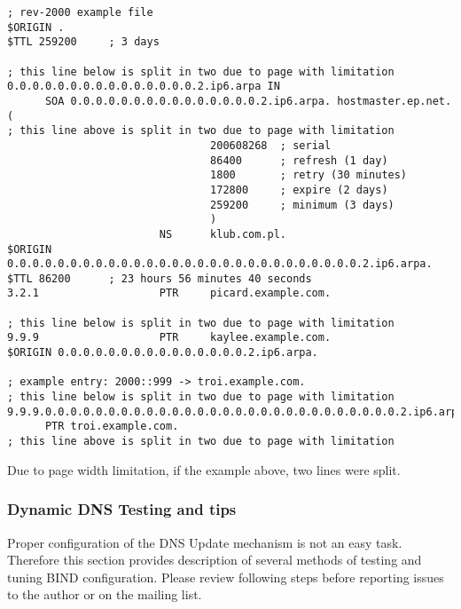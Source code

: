 \begin{lstlisting}
; rev-2000 example file
$ORIGIN .
$TTL 259200     ; 3 days

; this line below is split in two due to page with limitation
0.0.0.0.0.0.0.0.0.0.0.0.0.0.0.2.ip6.arpa IN
      SOA 0.0.0.0.0.0.0.0.0.0.0.0.0.0.0.2.ip6.arpa. hostmaster.ep.net. (
; this line above is split in two due to page with limitation
                                200608268  ; serial
                                86400      ; refresh (1 day)
                                1800       ; retry (30 minutes)
                                172800     ; expire (2 days)
                                259200     ; minimum (3 days)
                                )
                        NS      klub.com.pl.
$ORIGIN 0.0.0.0.0.0.0.0.0.0.0.0.0.0.0.0.0.0.0.0.0.0.0.0.0.0.0.0.2.ip6.arpa.
$TTL 86200      ; 23 hours 56 minutes 40 seconds
3.2.1                   PTR     picard.example.com.

; this line below is split in two due to page with limitation
9.9.9                   PTR     kaylee.example.com.
$ORIGIN 0.0.0.0.0.0.0.0.0.0.0.0.0.0.0.2.ip6.arpa.

; example entry: 2000::999 -> troi.example.com.
; this line below is split in two due to page with limitation
9.9.9.0.0.0.0.0.0.0.0.0.0.0.0.0.0.0.0.0.0.0.0.0.0.0.0.0.0.0.0.2.ip6.arpa
      PTR troi.example.com.
; this line above is split in two due to page with limitation
\end{lstlisting}
\Note Due to page width limitation, if the example above, two lines were
split.

\subsubsection{Dynamic DNS Testing and tips}
Proper configuration of the DNS Update mechanism is not an easy
task. Therefore this section provides description of several methods of
testing and tuning BIND configuration. Please review following steps
before reporting issues to the author or on the mailing list.

